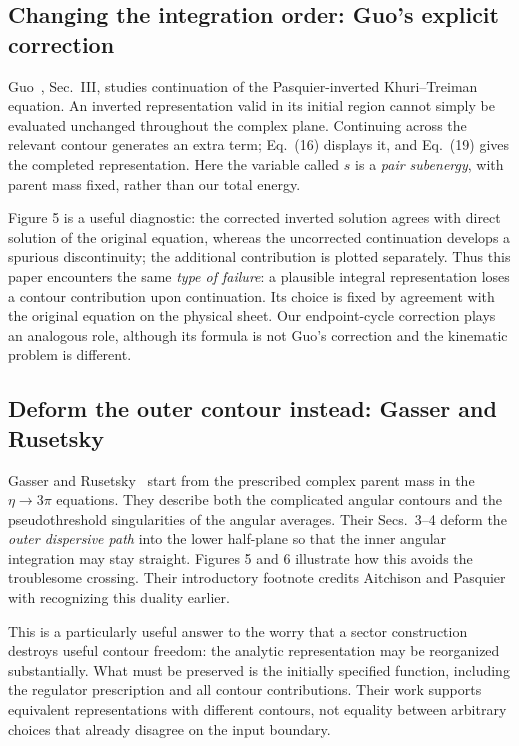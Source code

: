 \documentclass[11pt,a4paper]{article}
\begin{document}
\subsection{Changing the integration order: Guo's explicit correction}
Guo~\cite{guo}, Sec.~III, studies continuation of the Pasquier-inverted Khuri--Treiman equation. An inverted representation valid in its initial region cannot simply be evaluated unchanged throughout the complex plane. Continuing across the relevant contour generates an extra term; Eq.~(16) displays it, and Eq.~(19) gives the completed representation. Here the variable called $s$ is a \emph{pair subenergy}, with parent mass fixed, rather than our total energy.

Figure 5 is a useful diagnostic: the corrected inverted solution agrees with direct solution of the original equation, whereas the uncorrected continuation develops a spurious discontinuity; the additional contribution is plotted separately. Thus this paper encounters the same \emph{type of failure}: a plausible integral representation loses a contour contribution upon continuation. Its choice is fixed by agreement with the original equation on the physical sheet. Our endpoint-cycle correction plays an analogous role, although its formula is not Guo's correction and the kinematic problem is different.

\subsection{Deform the outer contour instead: Gasser and Rusetsky}
Gasser and Rusetsky~\cite{gasser} start from the prescribed complex parent mass in the $\eta\to3\pi$ equations. They describe both the complicated angular contours and the pseudothreshold singularities of the angular averages. Their Secs.~3--4 deform the \emph{outer dispersive path} into the lower half-plane so that the inner angular integration may stay straight. Figures 5 and 6 illustrate how this avoids the troublesome crossing. Their introductory footnote credits Aitchison and Pasquier with recognizing this duality earlier.

This is a particularly useful answer to the worry that a sector construction destroys useful contour freedom: the analytic representation may be reorganized substantially. What must be preserved is the initially specified function, including the regulator prescription and all contour contributions. Their work supports equivalent representations with different contours, not equality between arbitrary choices that already disagree on the input boundary.
\end{document}
